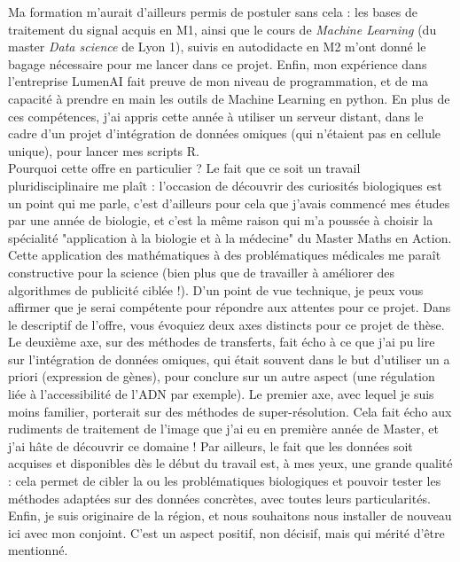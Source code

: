\documentclass[a4paper,12pt]{article}
\begin{document}
%
Ma formation m'aurait d'ailleurs permis de postuler sans cela : les bases de traitement du signal acquis en M1, ainsi que le cours de \textit{Machine Learning} (du master \textit{Data science} de Lyon 1), suivis en autodidacte en M2 m'ont donné le bagage nécessaire pour me lancer dans ce projet. Enfin, mon expérience dans l'entreprise LumenAI fait preuve de mon niveau de programmation, et de ma capacité à prendre en main les outils de Machine Learning en python. En plus de ces compétences, j'ai appris cette année à utiliser un serveur distant, dans le cadre d'un projet d'intégration de données omiques (qui n'étaient pas en cellule unique), pour lancer mes scripts R. \\
%

Pourquoi cette offre en particulier ? Le fait que ce soit un travail pluridisciplinaire me plaît : l'occasion de découvrir des curiosités biologiques est un point qui me parle, c'est d'ailleurs pour cela que j'avais commencé mes études par une année de biologie, et c'est la même raison qui m'a poussée à choisir la spécialité "application à la biologie et à la médecine" du Master Maths en Action. Cette application des mathématiques à des problématiques médicales me paraît constructive pour la science (bien plus que de travailler à améliorer des algorithmes de publicité ciblée !). 
D'un point de vue technique, je peux vous affirmer que je serai compétente pour répondre aux attentes pour ce projet. Dans le descriptif de l'offre, vous évoquiez deux axes distincts pour ce projet de thèse. Le deuxième axe, sur des méthodes de transferts, fait écho à ce que j'ai pu lire sur l'intégration de données omiques, qui était souvent dans le but d'utiliser un a priori (expression de gènes), pour conclure sur un autre aspect (une régulation liée à l'accessibilité de l'ADN par exemple). Le premier axe, avec lequel je suis moins familier, porterait sur des méthodes de super-résolution. Cela fait écho aux rudiments de traitement de l'image que j'ai eu en première année de Master, et j'ai hâte de découvrir ce domaine ! %
%
Par ailleurs, le fait que les données soit acquises et disponibles dès le début du travail est, à mes yeux, une grande qualité : cela permet de cibler la ou les problématiques biologiques et pouvoir tester les méthodes adaptées sur des données concrètes, avec toutes leurs particularités. Enfin, je suis originaire de la région, et nous souhaitons nous installer de nouveau ici avec mon conjoint. C'est un aspect positif, non décisif, mais qui mérité d'être mentionné. 
\\
%
\end{document}
